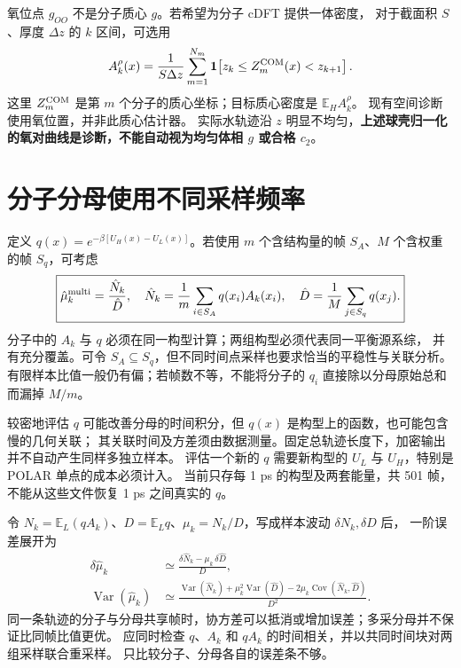 \documentclass[11pt,a4paper]{article}
\newcommand{\E}{\mathbb E}\newcommand{\Var}{\operatorname{Var}}
\begin{document}
氧位点 $g_{OO}$ 不是分子质心 $g$。若希望为分子 cDFT 提供一体密度，
对于截面积 $S$、厚度 $\Delta z$ 的 $k$ 区间，可选用
\begin{equation}
A_k^{\rho}(x)=\frac{1}{S\Delta z}\sum_{m=1}^{N_m}
\mathbf 1\!\left[z_k\le Z_m^{\rm COM}(x)<z_{k+1}\right].
\end{equation}
这里 $Z_m^{\rm COM}$ 是第 $m$ 个分子的质心坐标；目标质心密度是 $\E_H A_k^{\rho}$。
现有空间诊断使用氧位置，并非此质心估计器。
实际水轨迹沿 $z$ 明显不均匀，\textbf{上述球壳归一化的氧对曲线是诊断，不能自动视为均匀体相 $g$ 或合格 $c_2$}。

\newpage
\section{分子分母使用不同采样频率}
定义 $q(x)=e^{-\beta[U_H(x)-U_L(x)]}$。若使用 $m$ 个含结构量的帧
$S_A$、$M$ 个含权重的帧 $S_q$，可考虑
\begin{equation}\boxed{
\hat\mu_k^{\rm multi}=\frac{\hat N_k}{\hat D},\quad
\hat N_k=\frac1m\sum_{i\in S_A}q(x_i)A_k(x_i),\quad
\hat D=\frac1M\sum_{j\in S_q}q(x_j).}
\end{equation}
分子中的 $A_k$ 与 $q$ 必须在同一构型计算；两组构型必须代表同一平衡源系综，
并有充分覆盖。可令 $S_A\subseteq S_q$，但不同时间点采样也要求恰当的平稳性与关联分析。
有限样本比值一般仍有偏；若帧数不等，不能将分子的 $q_i$ 直接除以分母原始总和而漏掉 $M/m$。

较密地评估 $q$ 可能改善分母的时间积分，但 $q(x)$ 是构型上的函数，也可能包含慢的几何关联；
其关联时间及方差须由数据测量。固定总轨迹长度下，加密输出并不自动产生同样多独立样本。
评估一个新的 $q$ 需要新构型的 $U_L$ 与 $U_H$，特别是 POLAR 单点的成本必须计入。
当前只存每 1 ps 的构型及两套能量，共 501 帧，不能从这些文件恢复 1 ps 之间真实的 $q$。

令 $N_k=\E_L(qA_k)$、$D=\E_Lq$、$\mu_k=N_k/D$，写成样本波动 $\delta N_k,\delta D$ 后，
一阶误差展开为
\begin{align}
\delta\hat\mu_k&\simeq\frac{\delta\hat N_k-\mu_k\,\delta\hat D}{D},\\
\Var(\hat\mu_k)&\simeq\frac{\Var(\hat N_k)+\mu_k^2\Var(\hat D)
-2\mu_k\operatorname{Cov}(\hat N_k,\hat D)}{D^2}.
\end{align}
同一条轨迹的分子与分母共享帧时，协方差可以抵消或增加误差；多采分母并不保证比同帧比值更优。
应同时检查 $q$、$A_k$ 和 $qA_k$ 的时间相关，并以共同时间块对两组采样联合重采样。
只比较分子、分母各自的误差条不够。

\newpage
\end{document}

